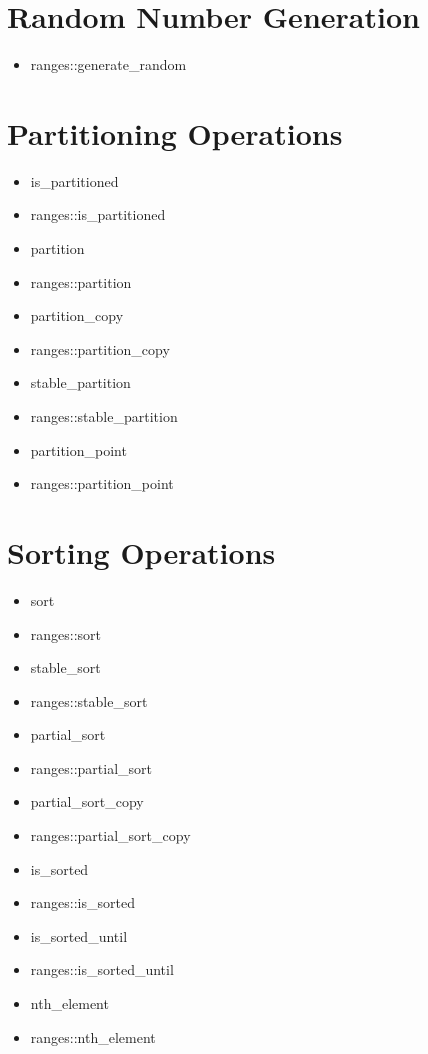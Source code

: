 \documentclass{article}
\begin{document}
\section{Random Number Generation}
    \begin{itemize}
      \item ranges::generate\_random
    \end{itemize}
\section{Partitioning Operations}
    \begin{itemize}
      \item is\_partitioned
      \item ranges::is\_partitioned
      \item partition
      \item ranges::partition
      \item partition\_copy
      \item ranges::partition\_copy
      \item stable\_partition
      \item ranges::stable\_partition
      \item partition\_point
      \item ranges::partition\_point
    \end{itemize}
\section{Sorting Operations}
    \begin{itemize}
      \item sort
      \item ranges::sort
      \item stable\_sort
      \item ranges::stable\_sort
      \item partial\_sort
      \item ranges::partial\_sort
      \item partial\_sort\_copy
      \item ranges::partial\_sort\_copy
      \item is\_sorted
      \item ranges::is\_sorted
      \item is\_sorted\_until
      \item ranges::is\_sorted\_until
      \item nth\_element
      \item ranges::nth\_element
    \end{itemize}
\end{document}
